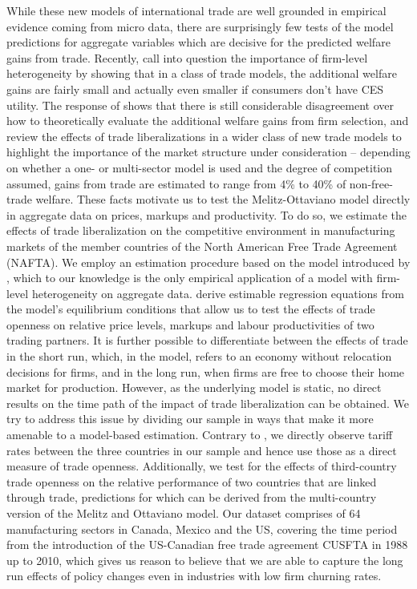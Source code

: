 While these new models of international trade are well grounded in empirical evidence coming from micro data, there are surprisingly few tests of the model predictions for aggregate variables which are decisive for the predicted welfare gains from trade. Recently, \citet{Arkolakisetal2012a,Arkolakisetal2012b} call into question the importance of firm-level heterogeneity by showing that in a class of trade models, the additional welfare gains are fairly small and actually even smaller if consumers don't have CES utility. The response of \citet{MelitzRedding2013} shows that there is still considerable disagreement over how to theoretically evaluate the additional welfare gains from firm selection, and \citet{CostinotRodriguez2014} review the effects of trade liberalizations in a wider class of new trade models to highlight the importance of the market structure under consideration -- depending on whether a one- or multi-sector model is used and the degree of competition assumed, gains from trade are estimated to range from 4\% to 40\% of non-free-trade welfare. These facts motivate us to test the Melitz-Ottaviano model directly in aggregate data on prices, markups and productivity. To do so, we estimate the effects of trade liberalization on the competitive environment in manufacturing markets of the member countries of the North American Free Trade Agreement (NAFTA). We employ an estimation procedure based on the \citet{MelitzOttaviano2008} model introduced by \citet{Chen2009}, which to our knowledge is the only empirical application of a model with firm-level heterogeneity on aggregate data. \citet{Chen2009} derive estimable regression equations from the model's equilibrium conditions that allow us to test the effects of trade openness on relative price levels, markups and labour productivities of two trading partners. It is further possible to differentiate between the effects of trade in the short run, which, in the model, refers to an economy without relocation decisions for firms, and in the long run, when firms are free to choose their home market for production. However, as the underlying model is static, no direct results on the time path of the impact of trade liberalization can be obtained. We try to address this issue by dividing our sample in ways that make it more amenable to a model-based estimation. Contrary to \citet{Chen2009}, we directly observe tariff rates between the three countries in our sample and hence use those as a direct measure of trade openness. Additionally, we test for the effects of third-country trade openness on the relative performance of two countries that are linked through trade, predictions for which can be derived from the multi-country version of the Melitz and Ottaviano model. Our dataset comprises of 64 manufacturing sectors in Canada, Mexico and the US, covering the time period from the introduction of the US-Canadian free trade agreement CUSFTA in 1988 up to 2010, which gives us reason to believe that we are able to capture the long run effects of policy changes even in industries with low firm churning rates. \\

